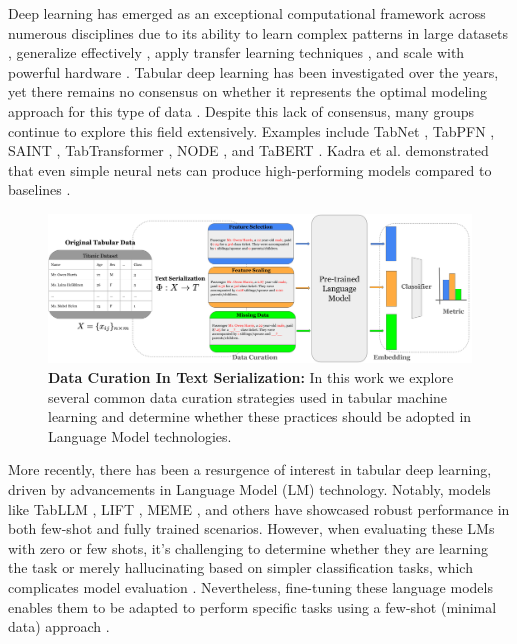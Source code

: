 \documentclass{article}
\theoremstyle{plain}
\theoremstyle{definition}
\theoremstyle{remark}
\begin{document}
Deep learning has emerged as an exceptional computational framework across numerous disciplines due to its ability to learn complex patterns in large datasets \cite{zhang2018analyzing, feng2019fringe}, generalize effectively \cite{sanh2021multitask}, apply transfer learning techniques \cite{torrey2010transfer, zhuang2020comprehensive, pan2009survey, niu2020decade, levin2022transfer}, and scale with powerful hardware \cite{mayer2020scalable, chilimbi2014project, rouhani2018deepsecure}. Tabular deep learning has been investigated over the years, yet there remains no consensus on whether it represents the optimal modeling approach for this type of data \cite{shwartz2022tabular, borisov2022deep, gorishniy2021revisiting}. Despite this lack of consensus, many groups continue to explore this field extensively. Examples include TabNet \cite{arik2021tabnet}, TabPFN \cite{hollmann2022tabpfn}, SAINT \cite{somepalli2021saint}, TabTransformer \cite{huang2020tabtransformer}, NODE \cite{popov2019neural}, and TaBERT \cite{yin2020tabert}. Kadra et al. demonstrated that even simple neural nets can produce high-performing models compared to baselines \cite{kadra2021well}.

\begin{figure}[h!]
    \centering
    \includegraphics[width=6.5in]{arc.png}
    \caption{\textbf{Data Curation In Text Serialization:} In this work we explore several common data curation strategies used in tabular machine learning and determine whether these practices should be adopted in Language Model technologies.}
    \label{arc}
\end{figure}

More recently, there has been a resurgence of interest in tabular deep learning, driven by advancements in Language Model (LM) technology. Notably, models like TabLLM \cite{hegselmann2023tabllm}, LIFT \cite{dinh2022lift}, MEME \cite{lee2024multimodal, lee2024emergency}, and others \cite{zhang2023towards} have showcased robust performance in both few-shot and fully trained scenarios. However, when evaluating these LMs with zero or few shots, it's challenging to determine whether they are learning the task \cite{webson2021prompt} or merely hallucinating based on simpler classification tasks, which complicates model evaluation \cite{ji2023towards, lee2024large}. Nevertheless, fine-tuning these language models enables them to be adapted to perform specific tasks using a few-shot (minimal data) approach \cite{harari2022few, liu2022few, perez2021true, zhao2021calibrate}.
\end{document}
